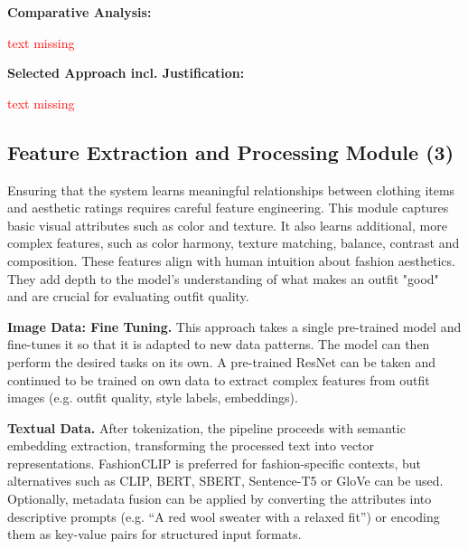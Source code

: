 \vspace{0.5cm}

\textbf{Comparative Analysis:}

\vspace{0.5cm}

\textcolor{red}{text missing}

\vspace{0.5cm}

\textbf{Selected Approach incl. Justification:}

\vspace{0.5cm}

\textcolor{red}{text missing}

\subsection{Feature Extraction and Processing Module (3)}

Ensuring that the system learns meaningful relationships between clothing items and aesthetic ratings requires careful feature engineering. This module captures basic visual attributes such as color and texture. It also learns additional, more complex features, such as color harmony, texture matching, balance, contrast and composition. These features align with human intuition about fashion aesthetics. They add depth to the model's understanding of what makes an outfit "good" and are crucial for evaluating outfit quality.

\vspace{0.5cm}

\textbf{Image Data: Fine Tuning.}
This approach takes a single pre-trained model and fine-tunes it so that it is adapted to new data patterns. The model can then perform the desired tasks on its own. A pre-trained ResNet can be taken and continued to be trained on own data to extract complex features from outfit images (e.g. outfit quality, style labels, embeddings).

\vspace{0.5cm}

\textbf{Textual Data.}
After tokenization, the pipeline proceeds with semantic embedding extraction, transforming the processed text into vector representations. Fashion\acs{CLIP} is preferred for fashion-specific contexts, but alternatives such as \acs{CLIP}, BERT, SBERT, Sentence-T5 or \acs{GloVe} can be used. Optionally, metadata fusion can be applied by converting the attributes into descriptive prompts (e.g. “A red wool sweater with a relaxed fit”) or encoding them as key-value pairs for structured input formats.


